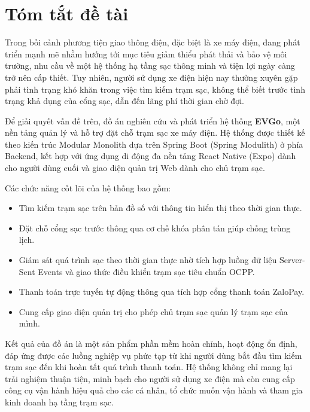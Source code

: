 \section*{Tóm tắt đề tài}
{}
Trong bối cảnh phương tiện giao thông điện, đặc biệt là xe máy điện, đang phát triển mạnh mẽ nhằm hướng tới mục tiêu giảm thiểu phát thải và bảo vệ môi trường, nhu cầu về một hệ thống hạ tầng sạc thông minh và tiện lợi ngày càng trở nên cấp thiết. Tuy nhiên, người sử dụng xe điện hiện nay thường xuyên gặp phải tình trạng khó khăn trong việc tìm kiếm trạm sạc, không thể biết trước tình trạng khả dụng của cổng sạc, dẫn đến lãng phí thời gian chờ đợi.

Để giải quyết vấn đề trên, đồ án nghiên cứu và phát triển hệ thống \textbf{EVGo}, một nền tảng quản lý và hỗ trợ đặt chỗ trạm sạc xe máy điện. Hệ thống được thiết kế theo kiến trúc Modular Monolith dựa trên Spring Boot (Spring Modulith) ở phía Backend, kết hợp với ứng dụng di động đa nền tảng React Native (Expo) dành cho người dùng cuối và giao diện quản trị Web dành cho chủ trạm sạc. 

Các chức năng cốt lõi của hệ thống bao gồm:
\begin{itemize}
    \item Tìm kiếm trạm sạc trên bản đồ số với thông tin hiển thị theo thời gian thực.
    \item Đặt chỗ cổng sạc trước thông qua cơ chế khóa phân tán giúp chống trùng lịch.
    \item Giám sát quá trình sạc theo thời gian thực nhờ tích hợp luồng dữ liệu Server-Sent Events và giao thức điều khiển trạm sạc tiêu chuẩn OCPP.
    \item Thanh toán trực tuyến tự động thông qua tích hợp cổng thanh toán ZaloPay.
    \item Cung cấp giao diện quản trị cho phép chủ trạm sạc quản lý trạm sạc của mình.
\end{itemize}

Kết quả của đồ án là một sản phẩm phần mềm hoàn chỉnh, hoạt động ổn định, đáp ứng được các luồng nghiệp vụ phức tạp từ khi người dùng bắt đầu tìm kiếm trạm sạc đến khi hoàn tất quá trình thanh toán. Hệ thống không chỉ mang lại trải nghiệm thuận tiện, minh bạch cho người sử dụng xe điện mà còn cung cấp công cụ vận hành hiệu quả cho các cá nhân, tổ chức muốn vận hành và tham gia kinh doanh hạ tầng trạm sạc.
